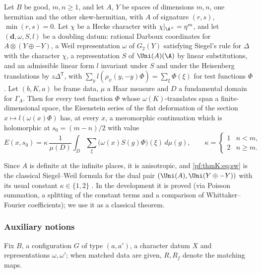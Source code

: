 \begin{littheorem}\label{pf:thmK:sw:thm}
Let $B$ be good, $m,n\ge1$, and let $A$, $Y$ be spaces of dimensions $m,n$, one hermitian and the other
skew-hermitian, with $A$ of signature $(r,s)$, $\min(r,s)=0$. Let $\chi$ be a Hecke character with
$\chi|_{\A^\times}=\eta^m$, and let $(\mathbf d,\omega,S,l)$ be a doubling datum: rational Darboux coordinates for
$A\otimes(Y\oplus-Y)$, a Weil representation $\omega$ of $G_2(Y)$ satisfying Siegel's rule for $\Delta$ with the
character $\chi$, a representation $S$ of $\Uni(A)(\A)$ by linear substitutions, and an admissible linear form $l$
invariant under $S$ and under the Heisenberg translations by $z\Delta^{\mathsf T}$, with
$\sum_{y}l(\rho_\psi(y,-y)\Phi)=\sum_\xi\Phi(\xi)$ for test functions $\Phi$. Let $(b,K,a)$ be frame data, $\mu$ a Haar
measure and $D$ a fundamental domain for $\Gamma_A$. Then for every test function $\Phi$ whose $\omega(K)$-translates span
a finite-dimensional space, the Eisenstein series of the flat deformation of the section $x\mapsto l(\omega(x)\Phi)$ has,
at every $x$, a meromorphic continuation which is holomorphic at $s_0=(m-n)/2$ with value
\begin{equation}\label{pf:thmK:eq:sw}
E(x,s_0)=\kappa\,\frac1{\mu(D)}\int_D\sum_\xi\bigl(\omega(x)S(g)\Phi\bigr)(\xi)\,d\mu(g),\qquad
\kappa=\begin{cases}1&n<m,\\2&n\ge m.\end{cases}
\end{equation}
\end{littheorem}

Since $A$ is definite at the infinite places, it is anisotropic, and \eqref{pf:thmK:eq:sw} is the classical Siegel--Weil
formula for the dual pair $(\Uni(A),\Uni(Y\oplus-Y))$ with its usual constant $\kappa\in\{1,2\}$
\cite{Weil1965,KudlaRallis1988,Ichino2004}. In the development it is proved (via Poisson summation, a splitting of the
constant terms and a comparison of Whittaker--Fourier coefficients); we use it as a classical theorem.

\subsubsection{Auxiliary notions}\label{sec:pf:thmK:aux}
Fix $B$, a configuration $G$ of type $(a,a')$, a character datum $X$ and representations $\omega,\omega'$; when matched
data are given, $R,R_f$ denote the matching maps.

